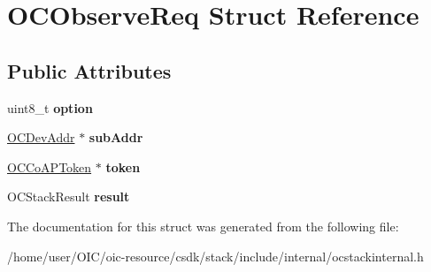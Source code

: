 \hypertarget{structOCObserveReq}{}\section{O\+C\+Observe\+Req Struct Reference}
\label{structOCObserveReq}
\subsection*{Public Attributes}
\begin{DoxyCompactItemize}
\item 
\hypertarget{structOCObserveReq_a2be6552e558495c16f70fd085570a088}{}uint8\+\_\+t {\bfseries option}\label{structOCObserveReq_a2be6552e558495c16f70fd085570a088}

\item 
\hypertarget{structOCObserveReq_adf24154476af84f82987273715b5fe92}{}\hyperlink{structOCDevAddr}{O\+C\+Dev\+Addr} $\ast$ {\bfseries sub\+Addr}\label{structOCObserveReq_adf24154476af84f82987273715b5fe92}

\item 
\hypertarget{structOCObserveReq_a54dad1d33411464f8a2769406d7978b2}{}\hyperlink{structOCCoAPToken}{O\+C\+Co\+A\+P\+Token} $\ast$ {\bfseries token}\label{structOCObserveReq_a54dad1d33411464f8a2769406d7978b2}

\item 
\hypertarget{structOCObserveReq_ae8212f08e16b6d604b98aa3647bb22d6}{}O\+C\+Stack\+Result {\bfseries result}\label{structOCObserveReq_ae8212f08e16b6d604b98aa3647bb22d6}

\end{DoxyCompactItemize}


The documentation for this struct was generated from the following file\+:\begin{DoxyCompactItemize}
\item 
/home/user/\+O\+I\+C/oic-\/resource/csdk/stack/include/internal/ocstackinternal.\+h\end{DoxyCompactItemize}
